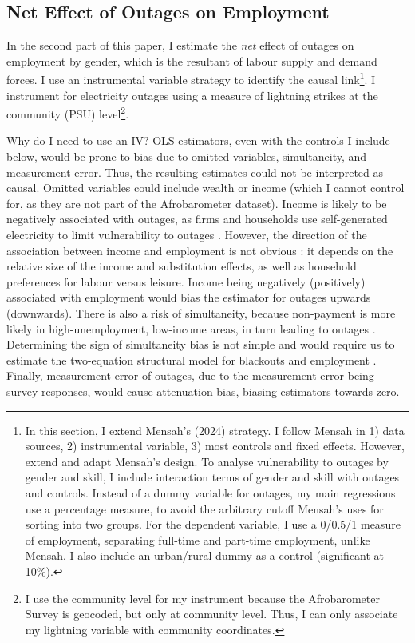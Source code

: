 \documentclass[12pt]{article}
\begin{document}
\subsection{Net Effect of Outages on Employment} \label{subsec:nemethod}
In the second part of this paper, I estimate the \textit{net} effect of outages on employment by gender, which is the resultant of labour supply and demand forces. I use an instrumental variable strategy to identify the causal link\footnote{In this section, I extend Mensah's (2024) \cite{mensah2024a} strategy. I follow Mensah in 1) data sources, 2) instrumental variable, 3) most controls and fixed effects. However, extend and adapt Mensah's design. To analyse vulnerability to outages by gender and skill, I include interaction terms of gender and skill with outages and controls. Instead of a dummy variable for outages, my main regressions use a percentage measure, to avoid the arbitrary cutoff Mensah's uses for sorting into two groups. For the dependent variable, I use a 0/0.5/1 measure of employment, separating full-time and part-time employment, unlike Mensah. I also include an urban/rural dummy as a control (significant at 10\%).}. I instrument for electricity outages using a measure of lightning strikes at the community (PSU) level\footnote{I use the community level for my instrument because the Afrobarometer Survey is geocoded, but only at community level. Thus, I can only associate my lightning variable with community coordinates.}.
\par
Why do I need to use an IV? OLS estimators, even with the controls I include below, would be prone to bias due to omitted variables, simultaneity, and measurement error. Thus, the resulting estimates could not be interpreted as causal. Omitted variables could include wealth or income (which I cannot control for, as they are not part of the Afrobarometer dataset). Income is likely to be negatively associated with outages, as firms and households use self-generated electricity to limit vulnerability to outages \cite{steinbuks2010a}. However, the direction of the association between income and employment is not obvious \cite{grogan2013a}: it depends on the relative size of the income and substitution effects, as well as household preferences for labour versus leisure. Income being negatively (positively) associated with employment would bias the estimator for outages upwards (downwards). There is also a risk of simultaneity, because non-payment is more likely in high-unemployment, low-income areas, in turn leading to outages \cite{dzansi2018a}. Determining the sign of simultaneity bias is not simple and would require us to estimate the two-equation structural model for blackouts and employment \cite{wooldridge2020a}. Finally, measurement error of outages, due to the measurement error being survey responses, would cause attenuation bias, biasing estimators towards zero. 
\end{document}
